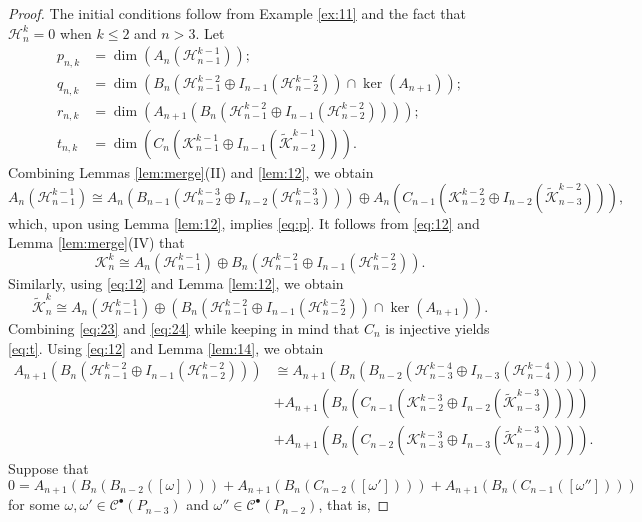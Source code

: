 \documentclass[12pt]{amsart}
\theoremstyle{definition}
\begin{document}
\begin{proof} The initial conditions follow from Example \ref{ex:11} and the fact that $\mathcal H_n^k=0$ when $k\le 2$ and $n> 3$. Let
\begin{align*}
p_{n,k} & =\dim (A_n(\mathcal H^{k-1}_{n-1}));\\
q_{n,k} & =\dim (B_n(\mathcal H_{n-1}^{k-2}\oplus I_{n-1}( \mathcal H_{n-2}^{k-2}))\cap \ker(A_{n+1})); \\
r_{n,k} & = \dim (A_{n+1}(B_n(\mathcal H_{n-1}^{k-2}\oplus I_{n-1}(\mathcal H_{n-2}^{k-2}))));\\
t_{n,k} & = \dim (C_n(\mathcal K_{n-1}^{k-1}\oplus I_{n-1}(\widetilde{\mathcal K}_{n-2}^{k-1}))).
\end{align*}
Combining Lemmas \ref{lem:merge}(II) and \ref{lem:12}, we obtain
\[A_n(\mathcal H_{n-1}^{k-1})\cong A_n(B_{n-1}(\mathcal H_{n-2}^{k-3}\oplus I_{n-2}(\mathcal H_{n-3}^{k-3})))\oplus A_n(C_{n-1}(\mathcal K_{n-2}^{k-2}\oplus I_{n-2}(\widetilde{\mathcal K}_{n-3}^{k-2}))),\]
which, upon using Lemma \ref{lem:12}, implies \eqref{eq:p}. It follows from \eqref{eq:12} and Lemma \ref{lem:merge}(IV) that
\begin{equation}\label{eq:23}
\mathcal K_n^k \cong A_n(\mathcal H_{n-1}^{k-1})\oplus B_n(\mathcal H_{n-1}^{k-2}\oplus I_{n-1}(\mathcal H_{n-2}^{k-2})). 
\end{equation}
Similarly, using \eqref{eq:12} and Lemma \ref{lem:12}, we obtain
\begin{equation}\label{eq:24}
\widetilde{\mathcal K}_n^k \cong A_n(\mathcal H_{n-1}^{k-1})\oplus (B_n(\mathcal H_{n-1}^{k-2}\oplus I_{n-1}(\mathcal H_{n-2}^{k-2}))\cap \ker(A_{n+1})).
\end{equation}
Combining \eqref{eq:23} and \eqref{eq:24} while keeping in mind that $C_n$ is injective yields \eqref{eq:t}. Using \eqref{eq:12} and Lemma \ref{lem:14}, we obtain
\begin{align*}
A_{n+1}(B_n(\mathcal H_{n-1}^{k-2}\oplus I_{n-1}(\mathcal H_{n-2}^{k-2}) ))& \cong A_{n+1}(B_n(B_{n-2}(\mathcal H_{n-3}^{k-4}\oplus I_{n-3}(\mathcal H_{n-4}^{k-4}))))\\
&+ A_{n+1}(B_n(C_{n-1}(\mathcal K_{n-2}^{k-3}\oplus I_{n-2}(\widetilde {\mathcal K}_{n-3}^{k-3}))))\\
&+ A_{n+1}(B_n(C_{n-2}(\mathcal K_{n-3}^{k-3}\oplus I_{n-3}(\widetilde {\mathcal K}_{n-4}^{k-3})))).
\end{align*}
Suppose that 
\[0=A_{n+1}(B_n(B_{n-2}([\omega])))+A_{n+1}(B_n(C_{n-2}([\omega'])))+A_{n+1}(B_n(C_{n-1}([\omega''])))\]
for some $\omega,\omega'\in \mathcal C^\bullet(P_{n-3})$ and $\omega''\in \mathcal C^\bullet(P_{n-2})$, that is,

\end{proof}
\end{document}
